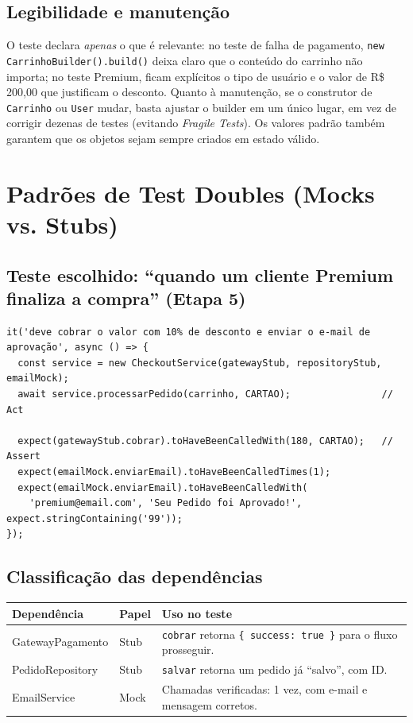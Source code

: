 \documentclass[11pt,a4paper]{article}
\begin{document}
\subsection{Legibilidade e manutenção}
O teste declara \emph{apenas} o que é relevante: no teste de falha de pagamento, \texttt{new CarrinhoBuilder().build()} deixa claro que o conteúdo do carrinho não importa; no teste Premium, ficam explícitos o tipo de usuário e o valor de R\$ 200,00 que justificam o desconto. Quanto à manutenção, se o construtor de \texttt{Carrinho} ou \texttt{User} mudar, basta ajustar o builder em um único lugar, em vez de corrigir dezenas de testes (evitando \emph{Fragile Tests}). Os valores padrão também garantem que os objetos sejam sempre criados em estado válido.

\section{Padrões de Test Doubles (Mocks vs. Stubs)}
\subsection{Teste escolhido: ``quando um cliente Premium finaliza a compra'' (Etapa 5)}
\begin{lstlisting}
it('deve cobrar o valor com 10% de desconto e enviar o e-mail de aprovação', async () => {
  const service = new CheckoutService(gatewayStub, repositoryStub, emailMock);
  await service.processarPedido(carrinho, CARTAO);                // Act

  expect(gatewayStub.cobrar).toHaveBeenCalledWith(180, CARTAO);   // Assert
  expect(emailMock.enviarEmail).toHaveBeenCalledTimes(1);
  expect(emailMock.enviarEmail).toHaveBeenCalledWith(
    'premium@email.com', 'Seu Pedido foi Aprovado!', expect.stringContaining('99'));
});
\end{lstlisting}

\subsection{Classificação das dependências}
\begin{tabular}{@{}l l p{7.5cm}@{}}
\toprule
\textbf{Dependência} & \textbf{Papel} & \textbf{Uso no teste}\\\midrule
GatewayPagamento & Stub & \texttt{cobrar} retorna \texttt{\{ success: true \}} para o fluxo prosseguir.\\
PedidoRepository & Stub & \texttt{salvar} retorna um pedido já ``salvo'', com ID.\\
EmailService & Mock & Chamadas verificadas: 1 vez, com e-mail e mensagem corretos.\\\bottomrule
\end{tabular}
\end{document}
